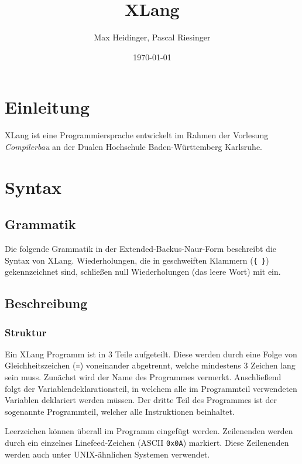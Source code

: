 \documentclass[a4paper]{article}
\title{XLang}
\author{Max Heidinger, Pascal Riesinger}
\date{\today}
\begin{document}
\maketitle


\section{Einleitung}

XLang ist eine Programmiersprache entwickelt im Rahmen der Vorlesung \textit{Compilerbau} an der
Dualen Hochschule Baden-Württemberg Karlsruhe.

\section{Syntax}

\subsection{Grammatik}

Die folgende Grammatik in der Extended-Backus-Naur-Form beschreibt die Syntax von XLang.
Wiederholungen, die in geschweiften Klammern (\texttt{\{ \}}) gekennzeichnet sind, schließen null Wiederholungen (das leere Wort) mit ein.




\subsection{Beschreibung}

\subsubsection{Struktur}

Ein XLang Programm ist in 3 Teile aufgeteilt.
Diese werden durch eine Folge von Gleichheitszeichen (\texttt{=}) voneinander abgetrennt, welche
mindestens 3 Zeichen lang sein muss.
Zunächst wird der Name des Programmes vermerkt.
Anschließend folgt der Variablendeklarationsteil, in welchem alle im Programmteil verwendeten
Variablen deklariert werden müssen.
Der dritte Teil des Programmes ist der sogenannte Programmteil, welcher alle Instruktionen
beinhaltet.

Leerzeichen können überall im Programm eingefügt werden. Zeilenenden werden durch
ein einzelnes Linefeed-Zeichen (ASCII \texttt{0x0A}) markiert. Diese Zeilenenden werden auch unter
UNIX-ähnlichen Systemen verwendet.
\end{document}
